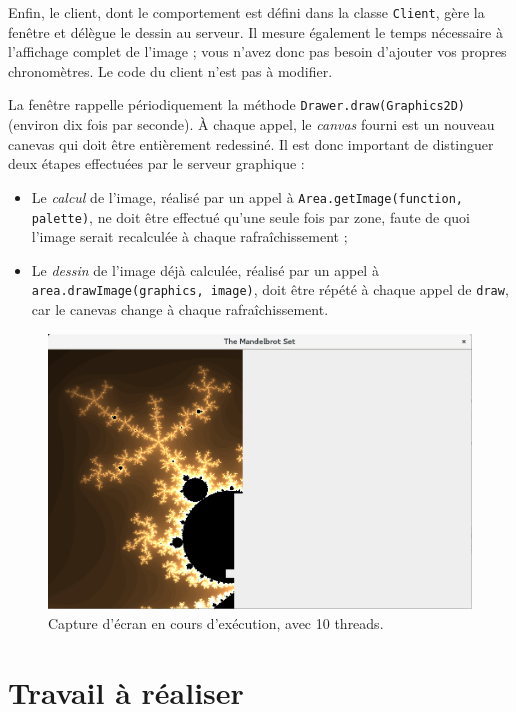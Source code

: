 \documentclass{td}
\begin{document}
Enfin, le client, dont le comportement est défini dans la classe \lstinline{Client},
gère la fenêtre et délègue le dessin au serveur.
Il mesure également le temps nécessaire à l'affichage complet de l'image ;
vous n'avez donc pas besoin d'ajouter vos propres chronomètres.
Le code du client n'est pas à modifier.

La fenêtre rappelle périodiquement la méthode \lstinline{Drawer.draw(Graphics2D)}
(environ dix fois par seconde).
À chaque appel, le \emph{canvas} fourni est un nouveau canevas
qui doit être entièrement redessiné.
Il est donc important de distinguer deux étapes effectuées par le serveur graphique :

\begin{itemize}
\item Le \emph{calcul} de l'image, réalisé par un appel à \lstinline{Area.getImage(function, palette)},
  ne doit être effectué qu'une seule fois par zone, faute de quoi l'image serait recalculée à chaque rafraîchissement ;
\item Le \emph{dessin} de l'image déjà calculée, réalisé par un appel à \lstinline{area.drawImage(graphics, image)},
  doit être répété à chaque appel de \lstinline{draw}, car le canevas change à chaque rafraîchissement.
\end{itemize}

\begin{figure}
    \begin{center}
      \includegraphics[width=.8\textwidth]{src/img/mandelbrot_running}
    \end{center}
  \caption{Capture d'écran en cours d'exécution, avec 10 threads.}
  \label{fig:running}
\end{figure}

\section{Travail à réaliser}
\end{document}
